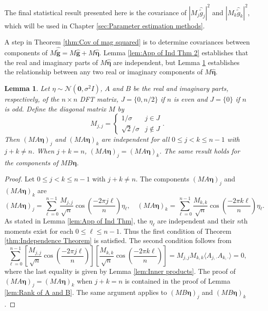 \documentclass[12pt,notitlepage]{report}
\newcommand{\gVec}{\mathbf{g}}	%
\newcommand{\gnoise}{\widetilde{g}}	%
\newcommand{\gnoiseVec}{\widetilde{\mathbf{g}}}	%
\newcommand{\noise}{\eta}	%
\newcommand{\noiseSD}{\sigma}	%
\newcommand{\noiseVec}{\bm{\noise}}	%
\newtheorem{lemma}{Lemma}[section]
\begin{document}
The final statistical result presented here is the covariance of $|M_j\widehat{\gnoise}_j|^2$ and $|M_k\widehat{\gnoise}_k|^2$, which will be used in Chapter \ref{sec:Parameter estimation methods}.  

A step in Theorem \ref{thm:Cov of mag squared} is to determine covariances between components of $M\widehat{\gnoiseVec} = M\widehat{\gVec} + M\widehat{\noiseVec}$. Lemma \ref{lem:App of Ind Thm 2} establishes that the real and imaginary parts of $M\widehat{\noiseVec}$ are independent, but Lemma \ref{lem:App of Ind Thm 3} establishes the relationship between any two real or imaginary components of $M\widehat{\noiseVec}$.

\begin{lemma}
\label{lem:App of Ind Thm 3}
Let $\noise \sim \mathcal{N}(\bm{0},\noiseSD^2 I)$, $A$ and $B$ be the real and imaginary parts, respectively, of the $n \times n$ DFT matrix, $J = \{0,n/2\}$ if $n$ is even and $J = \{0\}$ if $n$ is odd. Define the diagonal matrix $M$ by
\[M_{j,j} = \begin{cases}
1/\noiseSD & j \in J \\
\sqrt{2}/\noiseSD & j \not\in J
\end{cases}.\]
Then $(MA\noiseVec)_j$ and $(MA\noiseVec)_k$ are independent for all $0 \leq j < k \leq n-1$ with $j + k \neq n$. When $j + k = n$, $(MA\noiseVec)_j = (MA\noiseVec)_k$. The same result holds for the components of $MB\noiseVec$.
\end{lemma}
\begin{proof}
Let $0 \leq j < k \leq n-1$ with $j + k \neq n$. The components $(MA\noiseVec)_j$ and $(MA\noiseVec)_k$ are
\[(MA\noiseVec)_j = \sum_{\ell=0}^{n-1} \frac{M_{j,j}}{\sqrt{n}}\cos\left(\frac{-2\pi{j\ell}}{n}\right)\noise_{\ell}, \quad (MA\noiseVec)_k = \sum_{\ell=0}^{n-1} \frac{M_{k,k}}{\sqrt{n}}\cos\left(\frac{-2\pi{k\ell}}{n}\right)\noise_{\ell}.\]
As stated in Lemma \ref{lem:App of Ind Thm}, the $\noise_\ell$ are independent and their $n$th moments exist for each $0 \leq \ell \leq n-1$. Thus the first condition of Theorem \ref{thm:Independence Theorem} is satisfied. The second condition follows from
\[\sum_{\ell=0}^{n-1} \left[\frac{M_{j,j}}{\sqrt{n}}\cos\left(\frac{-2\pi{j\ell}}{n}\right)\right]\left[\frac{M_{k,k}}{\sqrt{n}}\cos\left(\frac{-2\pi{k\ell}}{n}\right)\right] = M_{j,j}M_{k,k} \langle A_{j,\cdot}A_{k,\cdot} \rangle = 0,\]
where the last equality is given by Lemma \ref{lem:Inner products}. The proof of $(MA\noiseVec)_j = (MA\noiseVec)_k$ when $j+k = n$ is contained in the proof of Lemma \ref{lem:Rank of A and B}. The same argument applies to $(MB\noiseVec)_j$ and $(MB\noiseVec)_k$.
\end{proof}
\end{document}
